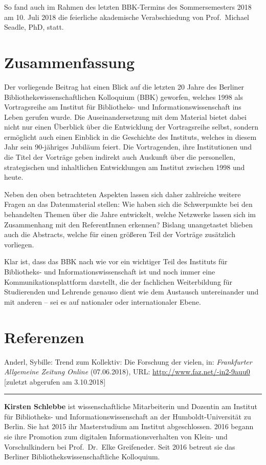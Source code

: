 \documentclass[a4paper,
fontsize=11pt,
oneside,
numbers=noperiodatend,
parskip=half-,
bibliography=totoc,
final
]{scrartcl}
\begin{document}
So fand auch im Rahmen des letzten BBK-Termins des Sommersemesters 2018
am 10. Juli 2018 die feierliche akademische Verabschiedung von
Prof.~Michael Seadle, PhD, statt.

\hypertarget{zusammenfassung}{%
\section{Zusammenfassung}\label{zusammenfassung}}

Der vorliegende Beitrag hat einen Blick auf die letzten 20 Jahre des
Berliner Bibliothekswissenschaftlichen Kolloquium (BBK) geworfen,
welches 1998 als Vortragsreihe am Institut für Bibliotheks- und
Informationswissenschaft ins Leben gerufen wurde. Die Auseinandersetzung
mit dem Material bietet dabei nicht nur einen Überblick über die
Entwicklung der Vortragsreihe selbst, sondern ermöglicht auch einen
Einblick in die Geschichte des Instituts, welches in diesem Jahr sein
90-jähriges Jubiläum feiert. Die Vortragenden, ihre Institutionen und
die Titel der Vorträge geben indirekt auch Auskunft über die
personellen, strategischen und inhaltlichen Entwicklungen am Institut
zwischen 1998 und heute.

Neben den oben betrachteten Aspekten lassen sich daher zahlreiche
weitere Fragen an das Datenmaterial stellen: Wie haben sich die
Schwerpunkte bei den behandelten Themen über die Jahre entwickelt,
welche Netzwerke lassen sich im Zusammenhang mit den ReferentInnen
erkennen? Bislang unangetastet blieben auch die Abstracts, welche für
einen größeren Teil der Vorträge zusätzlich vorliegen.

Klar ist, dass das BBK nach wie vor ein wichtiger Teil des Instituts für
Bibliotheks- und Informationswissenschaft ist und noch immer eine
Kommunikationsplattform darstellt, die der fachlichen Weiterbildung für
Studierenden und Lehrende genauso dient wie dem Austausch untereinander
und mit anderen -- sei es auf nationaler oder internationaler Ebene.

\hypertarget{referenzen}{%
\section{Referenzen}\label{referenzen}}

Anderl, Sybille: Trend zum Kollektiv: Die Forschung der vielen, in:
\emph{Frankfurter Allgemeine Zeitung Online} (07.06.2018), URL:
\url{http://www.faz.net/-in2-9auu0} {[}zuletzt abgerufen am 3.10.2018{]}

\begin{center}\rule{0.5\linewidth}{\linethickness}\end{center}

\textbf{Kirsten Schlebbe} ist wissenschaftliche Mitarbeiterin und
Dozentin am Institut für Bibliotheks- und Informationswissenschaft an
der Humboldt-Universität zu Berlin. Sie hat 2015 ihr Masterstudium am
Institut abgeschlossen. 2016 begann sie ihre Promotion zum digitalen
Informationsverhalten von Klein- und Vorschulkindern bei Prof.~Dr.~Elke
Greifeneder. Seit 2016 betreut sie das Berliner
Bibliothekswissenschaftliche Kolloquium.
\end{document}
